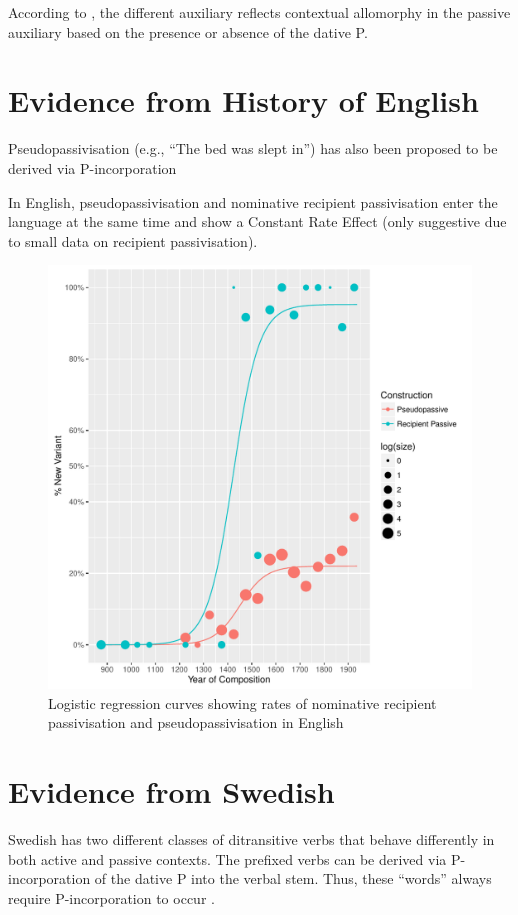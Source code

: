 \documentclass[11pt]{article}
\begin{document}
According to \cite{Alexiadou.2014}, the different auxiliary reflects contextual allomorphy in the passive auxiliary based on the presence or absence of the dative P.

\section{Evidence from History of English}

Pseudopassivisation (e.g., ``The bed was slept in'') has also been proposed to be derived via P-incorporation \citep{Herslund.1984}

In English, pseudopassivisation and nominative recipient passivisation enter the language at the same time and show a Constant Rate Effect (only suggestive due to small data on recipient passivisation).

	\begin{figure}[ht!]
		\includegraphics[width=\linewidth]{../images/recpas-pseudo}
		\caption{Logistic regression curves showing rates of nominative recipient passivisation and pseudopassivisation in English}
		\label{fig:recpas-pseudo}
	\end{figure}

\section{Evidence from Swedish}
Swedish has two different classes of ditransitive verbs that behave differently in both active and passive contexts. The prefixed verbs can be derived via P-incorporation of the dative P into the verbal stem. Thus, these ``words'' always require P-incorporation to occur \citep{Holmberg.1995}.
\end{document}
